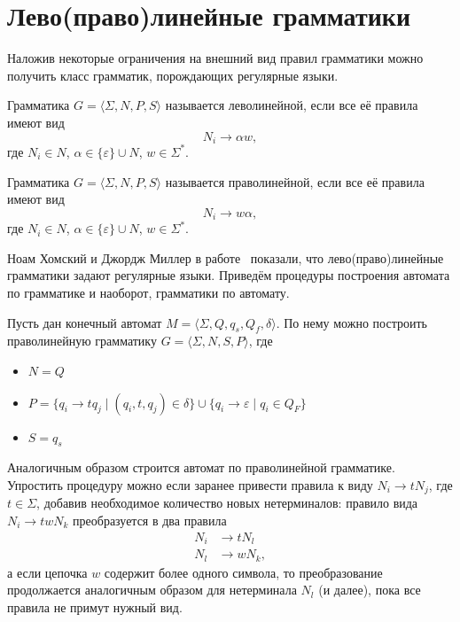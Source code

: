 \section{Лево(право)линейные грамматики}
\label{sec:LinearGrammars}

Наложив некоторые ограничения на внешний вид правил грамматики можно получить класс грамматик, порождающих регулярные языки.

\begin{definition}
    Грамматика $G=\langle \Sigma, N, P, S \rangle$ называется леволинейной, если все её правила имеют вид
    \[N_i \to \alpha w,\]
    где $N_i \in N$, $\alpha \in \{\varepsilon\} \cup N$, $w \in \Sigma ^*$.
\end{definition}

\begin{definition}
    Грамматика $G=\langle \Sigma, N, P, S \rangle$ называется праволинейной, если все её правила имеют вид
    \[N_i \to  w \alpha,\]
    где $N_i \in N$, $\alpha \in \{\varepsilon\} \cup N$, $w \in \Sigma ^*$.
\end{definition}

Ноам Хомский и Джордж Миллер в работе~ показали, что лево(право)линейные грамматики задают регулярные языки.
Приведём процедуры построения автомата по грамматике и наоборот, грамматики по автомату.

Пусть дан конечный автомат $M = \langle \Sigma, Q, q_s, Q_f, \delta \rangle$. По нему можно построить праволинейную грамматику $G=\langle \Sigma, N, S, P \rangle$, где
\begin{itemize}
    \item $N = Q$
    \item $P = \{ q_i \to t q_j \mid (q_i, t, q_j)\in \delta\} \cup \{ q_i \to \varepsilon \mid q_i \in Q_F\}$
    \item $S = q_s$
\end{itemize}

Аналогичным образом строится автомат по праволинейной грамматике.
Упростить процедуру можно если заранее привести правила к виду $N_i \to tN_j$, где $t\in \Sigma$, добавив необходимое количество новых нетерминалов:
правило вида $N_i \to twN_k$ преобразуется в два правила
\begin{align*}
    N_i & \to tN_l  \\
    N_l & \to wN_k,
\end{align*}
а если цепочка $w$ содержит более одного символа, то преобразование продолжается аналогичным образом для нетерминала $N_l$ (и далее), пока все правила не примут нужный вид.

